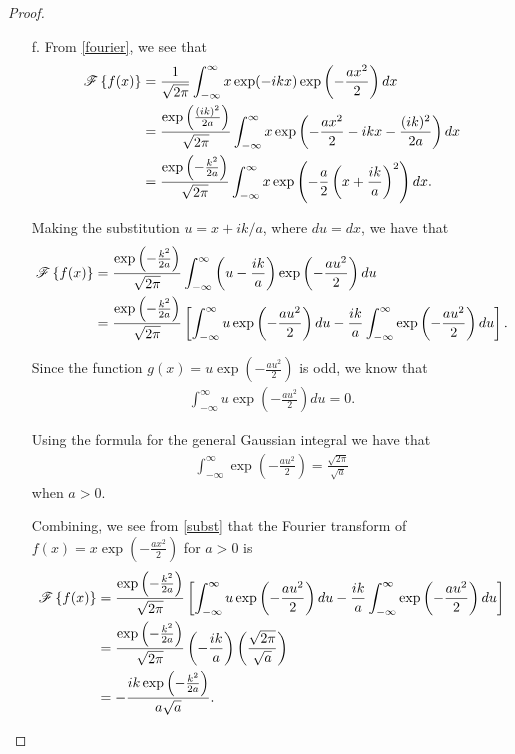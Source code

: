 \begin{proof}
\begin{enumerate}
    \item [f.] From \eqref{fourier}, we see that
      \begin{align*}
        \mathscr{F}\left\{ {f(x)} \right\} &= \frac{1}{\sqrt{2 \pi}} \int_{-\infty}^{\infty} x \exp(-ikx) \exp\left(-\frac{ax^2}{2}\right) dx \\
        &= \frac{\exp\left( \frac{(ik)^2}{2a} \right)}{\sqrt{2 \pi}} \int_{-\infty}^{\infty} x \exp\left(-\frac{ax^2}{2} - ikx - \frac{(ik)^2}{2a}\right)  dx \\
        &= \frac{\exp\left( -\frac{k^2}{2a} \right)}{\sqrt{2 \pi}} \int_{-\infty}^{\infty} x \exp\left(-\frac{a}{2} \left(x + \frac{ik}{a}\right)^2 \right)  dx.
      \end{align*}

      Making the substitution $u = x + ik/a$, where $du = dx$, we have that
      \begin{align}\label{subst}
        \mathscr{F}\left\{ {f(x)} \right\} &= \frac{\exp\left( -\frac{k^2}{2a} \right)}{\sqrt{2 \pi}} \int_{-\infty}^{\infty} \left(u - \frac{ik}{a}\right) \exp\left(-\frac{au^2}{2}  \right)  du \notag \\
        &= \frac{\exp\left( -\frac{k^2}{2a} \right)}{\sqrt{2 \pi}} \left[\int_{-\infty}^{\infty} u\exp\left(-\frac{au^2}{2}  \right) du - \frac{ik}{a}\int_{-\infty}^{\infty} \exp\left(-\frac{au^2}{2}  \right)du\right].
      \end{align}

      Since the function $g(x) = u\exp\left(-\frac{au^2}{2}\right)$ is odd, we know that
      \begin{align*}
        \int_{-\infty}^{\infty} u\exp\left(-\frac{au^2}{2}  \right) du = 0.
      \end{align*}

      Using the formula for the general Gaussian integral we have that
      \begin{align*}
        \int_{-\infty}^{\infty} \exp\left(-\frac{au^2}{2}  \right) = \frac{\sqrt{2\pi}}{\sqrt{a}}
      \end{align*}
      when $a > 0$.

      Combining, we see from \eqref{subst} that the Fourier transform of $\displaystyle f(x) = x \exp \left( -\frac{a x^2}{2} \right)$ for $a > 0$
      is
      \begin{align*}
        \mathscr{F}\left\{ {f(x)} \right\} &= \frac{\exp\left( -\frac{k^2}{2a} \right)}{\sqrt{2 \pi}} \left[\int_{-\infty}^{\infty} u\exp\left(-\frac{au^2}{2}  \right) du - \frac{ik}{a}\int_{-\infty}^{\infty} \exp\left(-\frac{au^2}{2}  \right)du\right] \\
        &= \frac{\exp\left( -\frac{k^2}{2a} \right)}{\sqrt{2 \pi}} \left(- \frac{ik}{a}\right) \left(\frac{\sqrt{2\pi}}{\sqrt{a}}\right) \\
        &= - \frac{ik\exp\left( -\frac{k^2}{2a} \right)}{a\sqrt{a}} .
      \end{align*}


\end{enumerate}
\end{proof}
